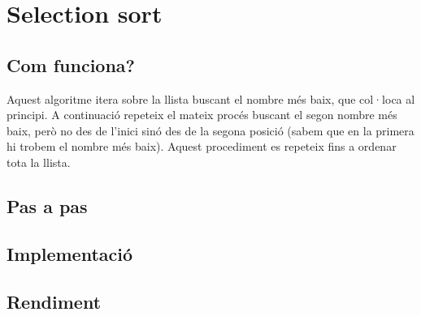 \chapter{Selection sort}

\section{Com funciona?}
Aquest algoritme itera sobre la llista buscant el nombre més baix, que col·loca al principi.
A continuació repeteix el mateix procés buscant el segon nombre més baix, però no des de l'inici sinó des de la segona posició (sabem que en la primera hi trobem el nombre més baix).
Aquest procediment es repeteix fins a ordenar tota la llista.

\section{Pas a pas}

\section{Implementació}

\begin{minipage}{\textwidth}
	\section{Rendiment}
	\noindent
	\makebox[\textwidth][c]{
		
	}
	\vspace*{1em}
	\begin{center}
		
	\end{center}
\end{minipage}
